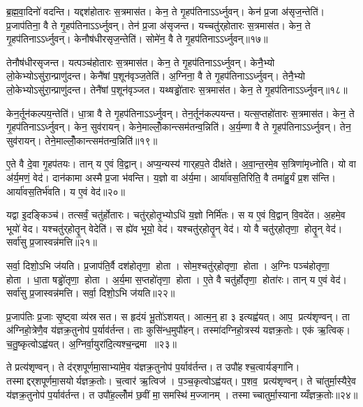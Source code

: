 ब्र॒ह्म॒वा॒दिनो॑ वदन्ति। यद्दश॑होतारः स॒त्रमास॑त। केन॒ ते गृ॒हप॑तिनाऽऽर्ध्नुवन्। केन॑ प्र॒जा अ॑सृज॒न्तेति॑। प्र॒जाप॑तिना॒ वै ते गृ॒हप॑तिनाऽऽर्ध्नुवन्। तेन॑ प्र॒जा अ॑सृजन्त। यच्चतु॑र्‌होतारः स॒त्रमास॑त। केन॒ ते गृ॒हप॑तिनाऽऽर्ध्नुवन्। केनौष॑धीरसृज॒न्तेति॑। सोमे॑न॒ वै ते गृ॒हप॑तिनाऽऽर्ध्नुवन्॥१७॥

तेनौष॑धीरसृजन्त। यत्पञ्च॑होतारः स॒त्रमास॑त। केन॒ ते गृ॒हप॑तिनाऽऽर्ध्नुवन्। केनै॒भ्यो लो॒केभ्योऽसु॑रा॒न्प्राणु॑दन्त। केनै॑षां प॒शून॑वृञ्ज॒तेति॑। अ॒ग्निना॒ वै ते गृ॒हप॑तिनाऽऽर्ध्नुवन्। तेनै॒भ्यो लो॒केभ्योऽसु॑रा॒न्प्राणु॑दन्त। तेनै॑षां प॒शून॑वृञ्जत। यथ्षड्ढो॑तारः स॒त्रमास॑त। केन॒ ते गृ॒हप॑तिनाऽऽर्ध्नुवन्॥१८॥

केन॒र्तून॑कल्पय॒न्तेति॑। धा॒त्रा वै ते गृ॒हप॑तिनाऽऽर्ध्नुवन्। तेन॒र्तून॑कल्पयन्त। यत्स॒प्तहो॑तारः स॒त्रमास॑त। केन॒ ते गृ॒हप॑तिनाऽऽर्ध्नुवन्। केन॒ सुव॑रायन्। केने॒माल्लोँ॒कान्त्सम॑तन्व॒न्निति॑। अ॒र्य॒म्णा वै ते गृ॒हप॑तिनाऽऽर्ध्नुवन्। तेन॒ सुव॑रायन्। तेने॒माल्लोँ॒कान्त्सम॑तन्व॒न्निति॑॥१९॥

ए॒ते वै दे॒वा गृ॒हप॑तयः। तान् य ए॒वं वि॒द्वान्। अप्य॒न्यस्य॑ गार्‌हप॒ते दीक्ष॑ते। अ॒वा॒न्त॒रमे॒व स॒त्रिणा॑मृध्नोति। यो वा अ॑र्य॒मणं॒ वेद॑। दान॑कामा अस्मै प्र॒जा भ॑वन्ति। य॒ज्ञो वा अ॑र्य॒मा। आर्या॑वस॒तिरिति॒ वै तमा॑हु॒र्यं प्र॒शस॑न्ति। आर्या॑वस॒तिर्भ॑वति। य ए॒वं वेद॑॥२०॥

यद्वा इ॒दङ्किञ्च॑। तत्सर्वं॒ चतु॑र्\mbox{}होतारः। चतु॑र्‌होतृ॒भ्योऽधि॑ य॒ज्ञो निर्मि॑तः। स य ए॒वं वि॒द्वान्‌ वि॒वदे॑त। अ॒हमे॒व भूयो॑ वेद। यश्चतु॑र्‌होतॄ॒न् वेदेति॑। स ह्ये॑व भूयो॒ वेद॑। यश्चतु॑र्‌होतॄ॒न् वेद॑। यो वै चतु॑र्‌होतृणा॒ होतॄ॒न् वेद॑। सर्वा॑सु प्र॒जास्वन्न॑मत्ति॥२१॥

सर्वा॒ दिशो॒ऽभि ज॑यति। प्र॒जाप॑ति॒र्वै दश॑होतृणा॒ होता। सोम॒श्चतु॑र्‌होतृणा॒ होता। अ॒ग्निः पञ्च॑होतृणा॒ होता। धा॒ता षड्ढो॑तृणा॒ होता। अ॒र्य॒मा स॒प्तहो॑तृणा॒ होता। ए॒ते वै चतु॑र्\mbox{}होतृणा॒ होता॑रः। तान् य ए॒वं वेद॑। सर्वा॑सु प्र॒जास्वन्न॑मत्ति। सर्वा॒ दिशो॒ऽभि ज॑यति॥२२॥\anuvakamend[आ॒र्ध्नु॒व॒न्ना॒र्ध्नु॒व॒न्नित्ये॒वं वेदात्ति सर्वा॒ दिशो॒ऽभि ज॑यति (वै तेन॑ स॒त्रङ्केन॑ ॥ )]

प्र॒जाप॑तिः प्र॒जाः सृ॒ष्ट्वा व्य॑स्रसत। स हृद॑यं भू॒तो॑ऽशयत्। आत्म॒न्॒ हा ३ इत्यह्व॑यत्। आप॒ प्रत्य॑शृण्वन्। ता अ॑ग्निहो॒त्रेणै॒व य॑ज्ञक्र॒तुनोप॑ प॒र्याव॑र्तन्त। ताः कुसि॑न्ध॒मुपौ॑हन्। तस्मा॑दग्निहो॒त्रस्य॑ यज्ञक्र॒तोः। एक॑ ऋ॒त्विक्। च॒तु॒ष्कृत्वोऽह्व॑यत्। अ॒ग्निर्वा॒युरा॑दि॒त्यश्च॒न्द्रमा॥२३॥

ते प्रत्य॑शृण्वन्। ते द॑र्‌शपूर्णमा॒साभ्या॑मे॒व य॑ज्ञक्र॒तुनोप॑ प॒र्याव॑र्तन्त। त उपौ॑हश्च॒त्वार्यङ्गा॑नि। तस्माद्दर्‌शपूर्णमा॒सयोर्यज्ञक्र॒तोः। च॒त्वार॑ ऋ॒त्विज॑। प॒ञ्च॒कृत्वोऽह्व॑यत्। प॒शव॒ प्रत्य॑शृण्वन्। ते चा॑तुर्मा॒स्यैरे॒व य॑ज्ञक्र॒तुनोप॑ प॒र्याव॑र्तन्त। त उपौ॑ह॒ल्लोँम॑ छ॒वीं मा॒समस्थि॑ म॒ज्जानम्। तस्माच्चातुर्मा॒स्यानाय्यँज्ञक्र॒तोः॥२४॥

